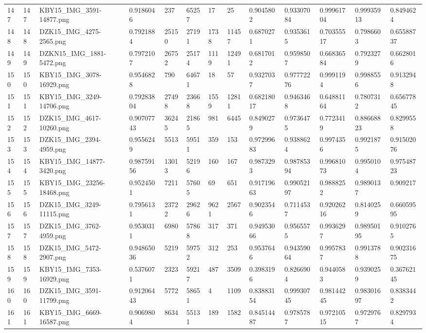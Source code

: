 \documentclass[11pt, a4paper, twoside]{report}
\begin{document}
\begin{longtable}[c]{@{}lllllllllllll@{}}
147 & 147 & KBY15\_IMG\_3591-14877.png & 0.9186046 & 237 & 65257 & 17 & 25 & 0.9045802 & 0.93307084 & 0.99961704 & 0.99935913 & 0.8494624 \\
148 & 148 & DZK15\_IMG\_4275-2565.png & 0.7921884 & 25150 & 27191 & 1738 & 11457 & 0.6870271 & 0.9353615 & 0.70355517 & 0.7986603 & 0.65588737 \\
149 & 149 & DZKN15\_IMG\_1881-5472.png & 0.7972107 & 26752 & 25174 & 1119 & 12491 & 0.6817012 & 0.9598507 & 0.66836584 & 0.7923279 & 0.6628016 \\
150 & 150 & KBY15\_IMG\_3078-16929.png & 0.9546828 & 790 & 64671 & 18 & 57 & 0.9327037 & 0.97772276 & 0.9991194 & 0.9988556 & 0.9132948 \\
151 & 151 & KBY15\_IMG\_3249-14706.png & 0.79283804 & 27498 & 23668 & 1559 & 12811 & 0.68218017 & 0.9463468 & 0.64881164 & 0.7807312 & 0.65677845 \\
152 & 152 & DZK15\_IMG\_4617-10260.png & 0.90707743 & 36245 & 21865 & 981 & 6445 & 0.8490279 & 0.9736475 & 0.7723419 & 0.88668823 & 0.8299558 \\
153 & 153 & DZK15\_IMG\_2394-4959.png & 0.9556249 & 5513 & 59511 & 359 & 153 & 0.97299683 & 0.9388624 & 0.9974356 & 0.9921875 & 0.91502076 \\
154 & 154 & KBY15\_IMG\_14877-3420.png & 0.98759156 & 13013 & 52196 & 160 & 167 & 0.9873293 & 0.98785394 & 0.99681073 & 0.9950104 & 0.97548723 \\
155 & 155 & KBY15\_IMG\_23256-18468.png & 0.9524501 & 7211 & 57605 & 69 & 651 & 0.91719663 & 0.99052197 & 0.9888252 & 0.9890137 & 0.909217 \\
156 & 156 & DZK15\_IMG\_3249-11115.png & 0.7956131 & 23722 & 29626 & 9621 & 2567 & 0.9023546 & 0.7114537 & 0.92026216 & 0.8140259 & 0.66059595 \\
157 & 157 & DZK15\_IMG\_3762-4959.png & 0.9530311 & 6980 & 57868 & 317 & 371 & 0.94953066 & 0.9565575 & 0.9936297 & 0.98950195 & 0.9102765 \\
158 & 158 & DZK15\_IMG\_5472-2907.png & 0.94865036 & 5219 & 59752 & 312 & 253 & 0.9537646 & 0.94359064 & 0.9957837 & 0.9913788 & 0.90231675 \\
159 & 159 & KBY15\_IMG\_7353-16929.png & 0.5376071 & 2323 & 59217 & 487 & 3509 & 0.3983196 & 0.8266904 & 0.9440583 & 0.9390259 & 0.36762145 \\
160 & 160 & DZK15\_IMG\_3591-11799.png & 0.91206443 & 5772 & 58651 & 4 & 1109 & 0.83883154 & 0.99930745 & 0.98144245 & 0.98301697 & 0.8383442 \\
161 & 161 & KBY15\_IMG\_6669-16587.png & 0.9069804 & 8634 & 55131 & 189 & 1582 & 0.84514487 & 0.9785787 & 0.97210515 & 0.9729767 & 0.8297934 \\

\end{longtable}
\end{document}
